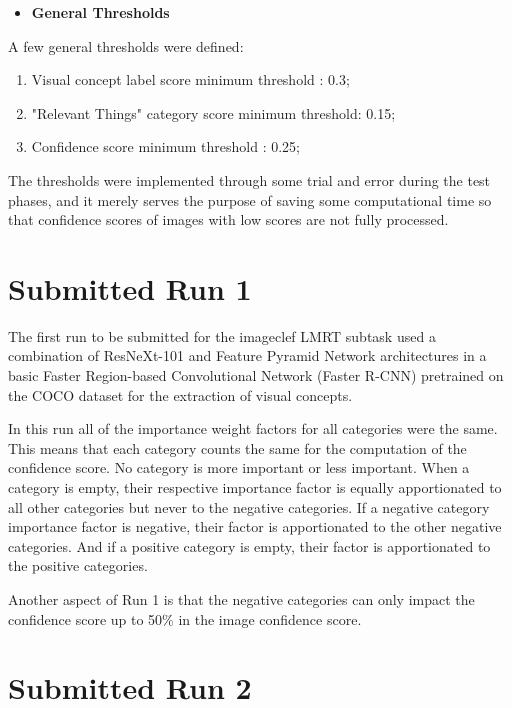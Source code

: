    \newpage
    \begin{itemize}
      \item \textbf{General Thresholds}
    \end{itemize}

    A few general thresholds were defined:

   \begin{enumerate}
    \item Visual concept label score minimum threshold : 0.3;
    \item "Relevant Things" category score  minimum threshold: 0.15;
    \item Confidence score minimum threshold  : 0.25;
   \end{enumerate}


   The thresholds were implemented through some trial and error during the test phases, and it merely serves the purpose of saving some computational time so that confidence scores of images with low scores are not fully processed. 



    \section{Submitted Run 1}
      \label{sec:run1}

    The first run to be submitted for the imageclef LMRT subtask used a combination of ResNeXt-101 and Feature Pyramid Network architectures in a basic Faster Region-based Convolutional Network (Faster R-CNN) pretrained on the COCO dataset for the extraction of visual concepts.

    In this run all of the importance weight factors for all categories were the same. This means that each category counts the same for the computation of the confidence score. No category is more important or less important. When a category is empty, their respective importance factor is equally apportionated to all other categories but never to the negative categories. If a negative category importance factor is negative, their factor is apportionated to the other negative categories. And if a positive category is empty, their factor is apportionated to the positive categories.

    Another aspect of Run 1 is that the negative categories can only impact the confidence score up to 50\% in the image confidence score.
    
 

    \section{Submitted Run 2}
    \label{sec:run2}
    
